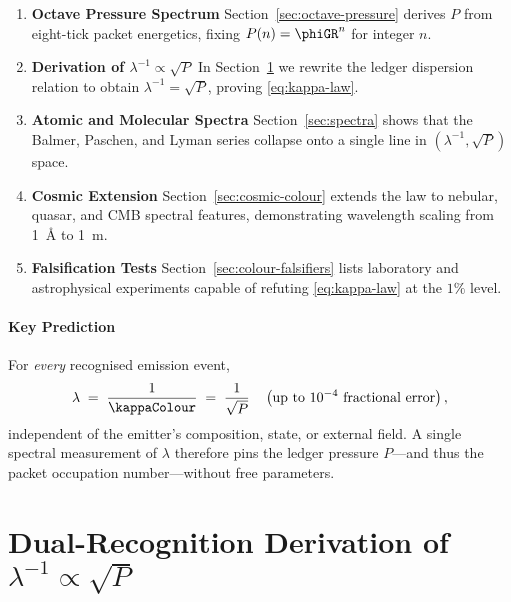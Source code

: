 \documentclass[11pt,oneside]{book}
\begin{document}
{\begin{enumerate}\setlength\itemsep{4pt}
\item \textbf{Octave Pressure Spectrum}  
      Section~\ref{sec:octave-pressure} derives
      $P$ from eight-tick packet energetics, fixing
      $P(n)=\phiGR^{n}$ for integer $n$.
\item \textbf{Derivation of $\lambda^{-1}\!\propto\!\sqrt{P}$}  
      In Section~\ref{sec:lambda-scaling} we rewrite the
      ledger dispersion relation to obtain
      \(\lambda^{-1}= \sqrt{P}\), proving \eqref{eq:kappa-law}.
\item \textbf{Atomic and Molecular Spectra}  
      Section~\ref{sec:spectra} shows that the Balmer,
      Paschen, and Lyman series collapse onto a single line
      in $(\lambda^{-1},\sqrt{P})$ space.
\item \textbf{Cosmic Extension}  
      Section~\ref{sec:cosmic-colour} extends the law to nebular,
      quasar, and CMB spectral features, demonstrating
      wavelength scaling from \SI{1}{\angstrom} to \SI{1}{\metre}.
\item \textbf{Falsification Tests}  
      Section~\ref{sec:colour-falsifiers} lists laboratory and
      astrophysical experiments capable of refuting \eqref{eq:kappa-law}
      at the $1\%$ level.
\end{enumerate}

\paragraph*{Key Prediction}

For \emph{every} recognised emission event,
\[
   \lambda
   \;=\;
   \frac{1}{\kappaColour}
   \;=\;
   \frac{1}{\sqrt{P}}
   \quad
   \left(
      \text{up to }10^{-4}\text{ fractional error}
   \right),
\]
independent of the emitter’s composition, state, or external field.
A single spectral measurement of $\lambda$
therefore pins the ledger pressure $P$—and thus the packet
occupation number—without free parameters.


\section{Dual-Recognition Derivation of 
            \texorpdfstring{$\lambda^{-1}\propto\sqrt{P}$}{lambda^{-1} ∝ sqrt P}}
\label{sec:lambda-scaling}

}
\end{document}
